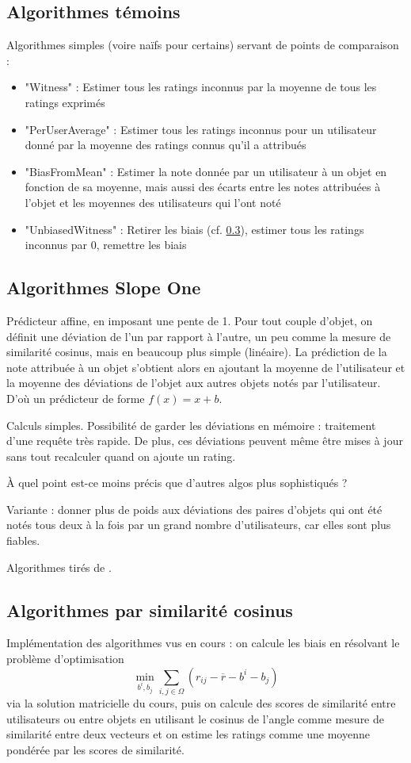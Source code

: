 \documentclass[11pt, openany, a4paper]{article}
\begin{document}
	\subsection{Algorithmes témoins}
		Algorithmes simples (voire naïfs pour certains) servant de points de comparaison : 
			\begin{itemize}
				\item{"Witness" : Estimer tous les ratings inconnus par la moyenne de tous les ratings exprimés}
				\item{"PerUserAverage" : Estimer tous les ratings inconnus pour un utilisateur donné par la moyenne des ratings connus qu'il a attribués}
				\item{"BiasFromMean" : Estimer la note donnée par un utilisateur à un objet en fonction de sa moyenne, mais aussi des écarts entre les notes attribuées à l'objet et les moyennes des utilisateurs qui l'ont noté}
				\item{"UnbiasedWitness" : Retirer les biais (cf. \ref{simCos}), estimer tous les ratings inconnus par $0$, remettre les biais}
			\end{itemize}
	
	\subsection{Algorithmes Slope One}
		Prédicteur affine, en imposant une pente de 1. Pour tout couple d'objet, on définit une déviation de l'un par rapport à l'autre, un peu comme la mesure de similarité cosinus, mais en beaucoup plus simple (linéaire). La prédiction de la note attribuée à un objet s'obtient alors en ajoutant la moyenne de l'utilisateur et la moyenne des déviations de l'objet aux autres objets notés par l'utilisateur. D'où un prédicteur de forme $f(x)=x+b$.
	
		
		
		Calculs simples. Possibilité de garder les déviations en mémoire : traitement d'une requête très rapide. De plus, ces déviations peuvent même être mises à jour sans tout recalculer quand on ajoute un rating.
		
		\`A quel point est-ce moins précis que d'autres algos plus sophistiqués ?
		
		Variante : donner plus de poids aux déviations des paires d'objets qui ont été notés tous deux à la fois par un grand nombre d'utilisateurs, car elles sont plus fiables.
		
		Algorithmes tirés de \cite{Lemire2007}.
	\subsection{Algorithmes par similarité cosinus}
		\label{simCos}
		Implémentation des algorithmes vus en cours : on calcule les biais en résolvant le problème d'optimisation $$\min_{b^i, b_j}\sum_{i,j\in\Omega}(r_{ij} - \overline{r} - b^i - b_j)$$ via la solution matricielle du cours, puis on calcule des scores de similarité entre utilisateurs ou entre objets en utilisant le cosinus de l'angle comme mesure de similarité entre deux vecteurs et on estime les ratings comme une moyenne pondérée par les scores de similarité.
		
\end{document}
